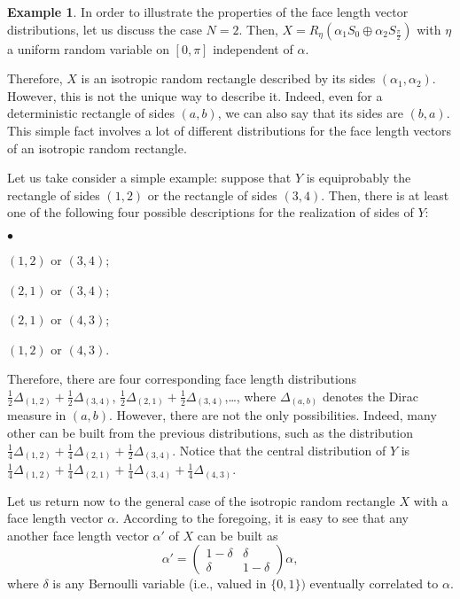 \documentclass[numbers,compress,v1.0.1]{vmsta}
\theoremstyle{definition}
\newtheorem{example}{Example}
\begin{document}
\begin{example}
In order to illustrate the properties of the face length vector
distributions, let us discuss the case $N=2$. Then, $X=R_\eta(\alpha_1
S_0\oplus\alpha_2 S_{\frac{\pi}{2}})$ with $\eta$ a uniform random
variable on $[0,\pi]$ independent of $\alpha$.

Therefore, $X$ is an isotropic random rectangle described by its sides
$(\alpha_1,\alpha_2)$. However, this is not the unique way to describe
it. Indeed, even for a deterministic rectangle of sides $(a,b)$, we can
also say that its sides are $(b,a)$. This simple fact involves a lot of
different distributions for the face length vectors of an isotropic
random rectangle.

Let us take consider a simple example: suppose that $Y$ is equiprobably
the rectangle of sides $(1,2)$ or the rectangle of sides $(3,4)$. Then,
there is at least one of the following four possible descriptions for
the realization of sides of $Y$:
%
\begin{list}{$\bullet$}{}
%
\item$(1,2)$ or $(3,4)$;
%
\item$(2,1)$ or $(3,4)$;
%
\item$(2,1)$ or $(4,3)$;
%
\item$(1,2)$ or $(4,3)$.
\end{list}
%
Therefore, there are four corresponding face length distributions $\frac
{1}{2}\Delta_{(1,2)}+\frac{1}{2}\Delta_{(3,4)}$,
$\frac{1}{2}\Delta_{(2,1)}+\frac{1}{2}\Delta_{(3,4)}$,\ldots, where $
\Delta_{(a,b)}$ denotes the Dirac measure in $(a,b)$. However, there
are not the only possibilities. Indeed, many other can be built from
the previous distributions, such as the distribution $\frac{1}{4}\Delta
_{(1,2)}+\frac{1}{4}\Delta_{(2,1)}+\frac{1}{2}\Delta_{(3,4)}$. Notice
that the central distribution of $Y$ is $\frac{1}{4}\Delta_{(1,2)}+\frac
{1}{4}\Delta_{(2,1)}+\frac{1}{4}\Delta_{(3,4)}+\frac{1}{4}\Delta
_{(4,3)}$.

Let us return now to the general case of the isotropic random rectangle
$X$ with a face length vector $\alpha$. According to the foregoing, it
is easy to see that any another face length vector $\alpha'$ of $X$ can
be built as
%
\begin{equation}
\alpha'= %
\begin{pmatrix}
1-\delta& \delta\\
\delta&1-\delta
\end{pmatrix} %
\alpha, \label{eq:example:RandomRectange}
\end{equation}
%
where $\delta$ is any Bernoulli variable \textup{(}i.e., valued in
$\lbrace0,1\rbrace)$ eventually correlated to $\alpha$.


\end{example}
\end{document}
